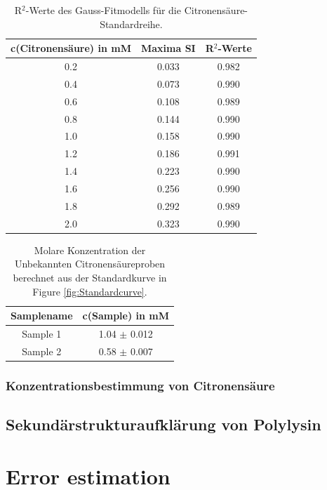 \documentclass[10pt,a4paper]{article}
\begin{document}
			\begin{table}[H]
			\centering
			\caption{R$^2$-Werte des Gauss-Fitmodells für die Citronensäure-Standardreihe.}
			\label{tab:r_square_standardcurve}
			\begin{tabular}{ccc}
				\toprule
				c(Citronensäure) in mM & Maxima SI &R$^2$-Werte\\
				\midrule
				0.2	&0.033&0.982\\
				0.4	&0.073&0.990\\
				0.6	&0.108&0.989\\
				0.8	&0.144&0.990\\
				1.0	&0.158&0.990\\
				1.2	&0.186&0.991\\
				1.4	&0.223&0.990\\
				1.6	&0.256&0.990\\
				1.8	&0.292&0.989\\
				2.0	&0.323&0.990\\
				\bottomrule
			\end{tabular}
		\end{table}	
		
	
		\begin{table}[H]
			\centering
			\caption{Molare Konzentration der Unbekannten Citronensäureproben berechnet aus der Standardkurve in Figure \ref{fig:Standardcurve}.}
			\label{tab:sampleconc}
			\begin{tabular}{cc}
				\toprule
				Samplename & c(Sample) in mM\\
				\midrule
				Sample 1 & 1.04 $\pm$ 0.012\\
				Sample 2 & 0.58 $\pm$ 0.007\\
				\bottomrule
			\end{tabular}
		\end{table}	
	\subsubsection{Konzentrationsbestimmung von Citronensäure}
	\subsection{Sekundärstrukturaufklärung von Polylysin}
	
	\section{Error estimation}
	
	
	
\end{document}
